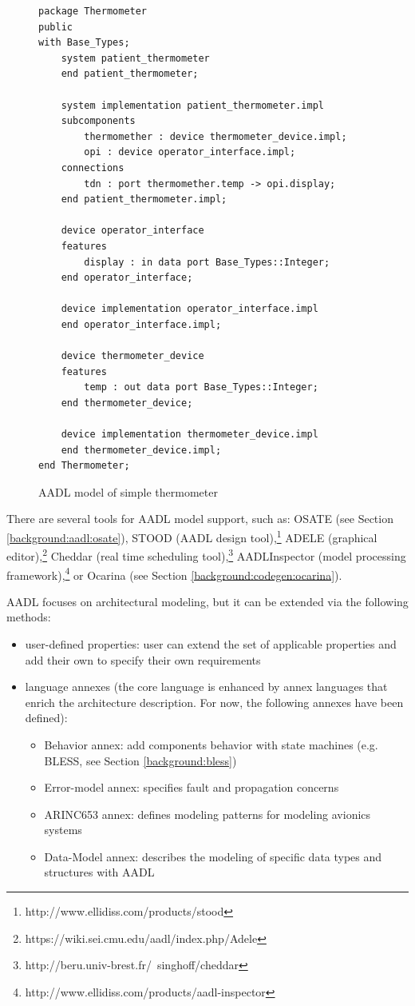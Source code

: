 \begin{figure}
\singlespacing
\begin{lstlisting}[language=aadl, frame=single, gobble=0]
package Thermometer
public
with Base_Types;
	system patient_thermometer
	end patient_thermometer;

	system implementation patient_thermometer.impl
	subcomponents
		thermomether : device thermometer_device.impl;
		opi : device operator_interface.impl;
	connections
		tdn : port thermomether.temp -> opi.display;
	end patient_thermometer.impl;

	device operator_interface
	features
		display : in data port Base_Types::Integer;
	end operator_interface;

	device implementation operator_interface.impl
	end operator_interface.impl;

	device thermometer_device
	features
		temp : out data port Base_Types::Integer;
	end thermometer_device;

	device implementation thermometer_device.impl
	end thermometer_device.impl;
end Thermometer;
\end{lstlisting} 
\doublespacing
\caption{AADL model of simple thermometer}
\label{listing:patient_thermometer}
\end{figure}

There are several tools for AADL model support, such as: OSATE (see Section \ref{background:aadl:osate}), STOOD (AADL design tool),\footnote{http://www.ellidiss.com/products/stood} ADELE (graphical editor),\footnote{https://wiki.sei.cmu.edu/aadl/index.php/Adele} Cheddar (real time scheduling tool),\footnote{http://beru.univ-brest.fr/~singhoff/cheddar} AADLInspector (model processing framework),\footnote{http://www.ellidiss.com/products/aadl-inspector} or Ocarina (see Section \ref{background:codegen:ocarina}).

AADL focuses on architectural modeling, but it can be extended via the following methods:
\begin{itemize}
	\item user-defined properties: user can extend the set of applicable properties and add their own to specify their own requirements
	\item {language annexes (the core language is enhanced by annex languages that enrich the architecture description. For now, the following annexes have been defined):
		\begin{itemize}
			\item Behavior annex: add components behavior with state machines (e.g. BLESS, see Section \ref{background:bless})
			\item Error-model annex: specifies fault and propagation concerns
			\item ARINC653 annex: defines modeling patterns for modeling avionics systems
			\item Data-Model annex: describes the modeling of specific data types and structures with AADL
		\end{itemize}
		}
\end{itemize}

